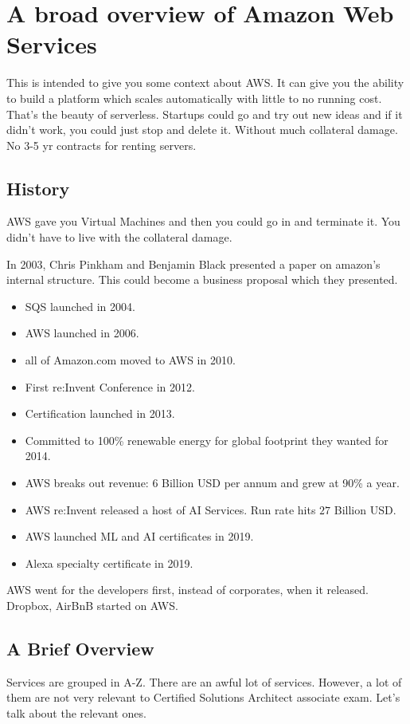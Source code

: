 \chapter{A broad overview of Amazon Web Services}
This is intended to give you some context about AWS.
It can give you the ability to build a platform which scales automatically with little to no running cost. That's the beauty of serverless. Startups could go and try out new ideas and if it didn't work, you could just stop and delete it. Without much collateral damage. No 3-5 yr contracts for renting servers.

\section{History}
AWS gave you Virtual Machines and then you could go in and terminate it. You didn't have to live with the collateral damage. 

In 2003, Chris Pinkham and Benjamin Black presented a paper on amazon's internal structure. This could become a business proposal which they presented.

\begin{itemize}
	\item SQS launched in 2004.
	\item AWS launched in 2006.
	\item all of Amazon.com moved to AWS in 2010.
	\item First re:Invent Conference in 2012.
	\item Certification launched in 2013.
	\item Committed to 100\% renewable energy for global footprint they wanted for 2014.
	\item AWS breaks out revenue: 6 Billion USD per annum and grew at 90\% a year.
	\item AWS re:Invent released a host of AI Services. Run rate hits $27$ Billion USD.
	\item AWS launched ML and AI certificates in 2019.
	\item Alexa specialty certificate in 2019.
\end{itemize}

AWS went for the developers first, instead of corporates, when it released. Dropbox, AirBnB started on AWS.

\section{A Brief Overview}
Services are grouped in A-Z. There are an awful lot of services. However, a lot of them are not very relevant to Certified Solutions Architect associate exam.
Let's talk about the relevant ones.

